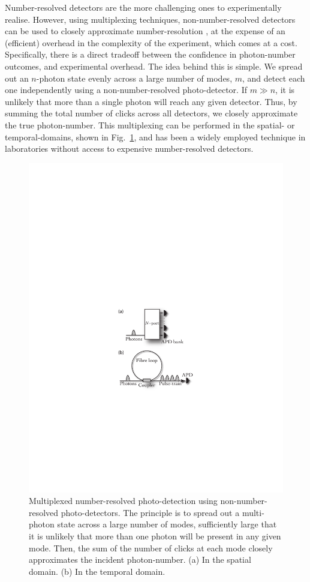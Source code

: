 \documentclass[aps, rmp, twocolumn, amsmath, amssymb, nofootinbib, superscriptaddress, longbibliography, floatfix, table-of-contents, eqsecnum]{revtex4-1}
\begin{document}
Number-resolved detectors are the more challenging ones to experimentally realise. However, using multiplexing techniques, non-number-resolved detectors can be used to closely approximate number-resolution \cite{bib:Fitch03, bib:Banaszek03, bib:Achilles04, bib:RohdeCompDet07}, at the expense of an (efficient) overhead in the complexity of the experiment, which comes at a cost. Specifically, there is a direct tradeoff between the confidence in photon-number outcomes, and experimental overhead. The idea behind this is simple. We spread out an $n$-photon state evenly across a large number of modes, $m$, and detect each one independently using a non-number-resolved photo-detector. If \mbox{$m\gg n$}, it is unlikely that more than a single photon will reach any given detector. Thus, by summing the total number of clicks across all detectors, we closely approximate the true photon-number. This multiplexing can be performed in the spatial- or temporal-domains, shown in Fig.~\ref{fig:det_mult}, and has been a widely employed technique in laboratories without access to expensive number-resolved detectors.

\begin{figure}[!htb]
\includegraphics[width=0.7\columnwidth]{detector_multiplexing}
\caption{Multiplexed number-resolved photo-detection using non-number-resolved photo-detectors. The principle is to spread out a multi-photon state across a large number of modes, sufficiently large that it is unlikely that more than one photon will be present in any given mode. Then, the sum of the number of clicks at each mode closely approximates the incident photon-number. (a) In the spatial domain. (b) In the temporal domain.} \label{fig:det_mult}
\end{figure}
\end{document}
